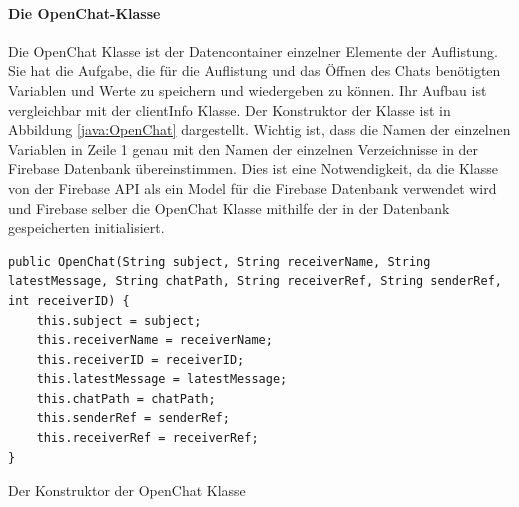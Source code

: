 \documentclass[a4paper,11pt]{report}
\newenvironment{code}{\captionsetup{type=figure}}{}
\begin{document}
			\paragraph{Die OpenChat-Klasse}
			Die OpenChat Klasse ist der Datencontainer einzelner Elemente der Auflistung. Sie hat die Aufgabe, die für die Auflistung und das Öffnen des Chats benötigten Variablen und Werte zu speichern und wiedergeben zu können. Ihr Aufbau ist vergleichbar mit der clientInfo Klasse.  Der Konstruktor der Klasse ist in Abbildung \ref{java:OpenChat} dargestellt. Wichtig ist, dass die Namen der einzelnen Variablen in Zeile 1 genau mit den Namen der einzelnen Verzeichnisse in der Firebase Datenbank übereinstimmen. Dies ist eine Notwendigkeit, da die Klasse von der Firebase API als ein Model für die Firebase Datenbank verwendet wird und Firebase selber die OpenChat Klasse mithilfe der in der Datenbank gespeicherten initialisiert.
			
\begin{code}
	\begin{center}
		\begin{verbatim}
public OpenChat(String subject, String receiverName, String latestMessage, String chatPath, String receiverRef, String senderRef, int receiverID) {
	this.subject = subject;
	this.receiverName = receiverName;
	this.receiverID = receiverID;
	this.latestMessage = latestMessage;
	this.chatPath = chatPath;
	this.senderRef = senderRef;
	this.receiverRef = receiverRef;
}					
		\end{verbatim}
	\caption{Der Konstruktor der OpenChat Klasse}\label{java:OpenChat}
	\end{center}
\end{code}	
\end{document}
